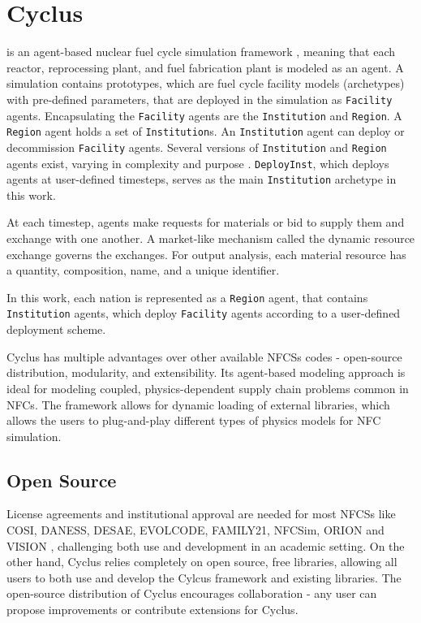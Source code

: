 \section{Cyclus}

\Cyclus is an agent-based nuclear fuel cycle simulation framework 
\cite{huff_fundamental_2016}, meaning
that each reactor, reprocessing plant, and fuel fabrication plant is modeled as an agent.
A \Cyclus simulation contains prototypes, which are fuel cycle facility models (archetypes) with
pre-defined parameters, that are deployed in the simulation as \texttt{Facility} agents.
Encapsulating the \texttt{Facility} agents are the \texttt{Institution} and \texttt{Region}.
A \texttt{Region} agent holds a set of \texttt{Institution}s. 
An \texttt{Institution} agent can deploy or decommission \texttt{Facility} agents.
Several versions of \texttt{Institution}
and \texttt{Region} agents exist, varying in complexity and purpose \cite{huff_extensions_2014}.
\texttt{DeployInst}, which deploys agents at user-defined timesteps, serves
as the main \texttt{Institution} archetype in this work.

At each timestep,
agents make requests for materials or bid to supply them and exchange
with one another. A market-like mechanism called the dynamic resource exchange
\cite{gidden_agent-based_2015} governs the exchanges.
For output analysis, each material resource has a quantity, composition, name, and a unique identifier.

In this work, each nation is represented as a \texttt{Region} agent,
that contains \texttt{Institution} agents, which deploy \texttt{Facility} 
agents according to a user-defined deployment scheme.

Cyclus has multiple advantages over other available
\glspl{NFCS} codes - open-source distribution, modularity,
and extensibility. Its agent-based modeling approach
is ideal for modeling coupled, physics-dependent
supply chain problems common in \glspl{NFC}.
The framework allows for dynamic loading of 
external libraries, which allows the users to plug-and-play
different types of physics models for \gls{NFC}
simulation.

\subsection{Open Source}
License agreements and institutional
approval are needed for most \glspl{NFCS} like COSI, DANESS, DESAE, EVOLCODE,
FAMILY21, NFCSim, ORION and VISION \cite{jacobson_verifiable_2010}, challenging
both use and development in an academic setting.
On the other hand, Cyclus relies completely on open source,
free libraries, allowing all users to both use and develop the
Cylcus framework and existing libraries. The open-source distribution
of Cyclus encourages collaboration - any user can propose
improvements or contribute extensions for Cyclus.

